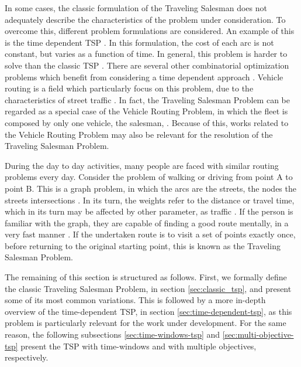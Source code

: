 In some cases, the classic formulation of the Traveling Salesman does not adequately describe the characteristics of the problem under consideration. To overcome this, different problem formulations are considered. An example of this is the time dependent TSP \cite{cite_12}. In this formulation, the cost of each arc is not constant, but varies as a function of time. In general, this problem is harder to solve than the classic TSP \cite{cite_21}. There are several other combinatorial optimization problems which benefit from considering a time dependent approach \cite{cite_20}. Vehicle routing is a field which particularly focus on this problem, due to the characteristics of street traffic \cite{cite_19}. In fact, the Traveling Salesman Problem can be regarded as a special case of the Vehicle Routing Problem, in which the fleet is composed by only one vehicle, the salesman, \cite{cite_19}. Because of this, works related to the Vehicle Routing Problem may also be relevant for the resolution of the Traveling Salesman Problem.

During the day to day activities, many people are faced with similar routing problems every day. Consider the problem of walking or driving from point A to point B. This is a graph problem, in which the arcs are the streets, the nodes the streets intersections \cite{cite_11}. In its turn, the weights refer to the distance or travel time, which in its turn may be affected by other parameter, as traffic \cite{cite_12}. If the person is familiar with the graph, they are capable of finding a good route mentally, in a very fast manner \cite{cite_13}. If the undertaken route is to visit a set of points exactly once, before returning to the original starting point, this is known as the Traveling Salesman Problem. 

The remaining of this section is structured as follows. First, we formally define the classic Traveling Salesman Problem, in section \ref{sec:classic_tsp}, and present some of its most common variations. This is followed by a more in-depth overview of the time-dependent TSP, in section \ref{sec:time-dependent-tsp}, as this problem is particularly relevant for the work under development. For the same reason, the following subsections \ref{sec:time-windows-tsp} and \ref{sec:multi-objective-tsp} present the TSP with time-windows and with multiple objectives, respectively.